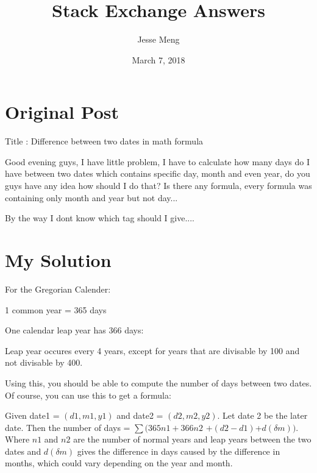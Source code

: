 \documentclass{article}
\title{Stack Exchange Answers}
\author{Jesse Meng }
\date{March 7, 2018}
\begin{document}
\maketitle

\section{Original Post}
Title : Difference between two dates in math formula

Good evening guys, I have little problem, I have to calculate how many days do I have between two dates which contains specific day, month and even year, do you guys have any idea how should I do that? Is there any formula, every formula was containing only month and year but not day... 

By the way I dont know which tag should I give....
\section{My Solution}
For the Gregorian Calender:

1 common year = 365 days

One calendar leap year has 366 days:



Leap year occures every 4 years, except for years that are divisable by 100 and not divisable by 400.

Using this, you should be able to compute the number of days between two dates. Of course,  you can use this to get a formula:

Given date1 = $(d1, m1, y1)$ and date2 = $(d2, m2, y2)$. Let date 2 be the later date. Then the number of days = $\sum(365n1+366n2$ $+(d2-d1)$+$d(\delta m))$. Where $n1$ and $n2$ are the number of normal years and leap years between the two dates and $d(\delta m)$ gives the difference in days caused by the difference in months, which could vary depending on the year and month. 
\end{document}
